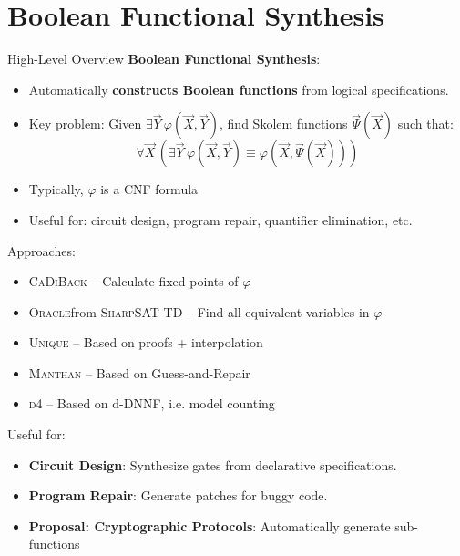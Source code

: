 \documentclass[aspectratio=169]{beamer}
\begin{document}
\section{Boolean Functional Synthesis}
\begin{frame}{High-Level Overview}
  \textbf{Boolean Functional Synthesis}:
  \begin{itemize}
    \item Automatically \textbf{constructs Boolean functions} from logical specifications.
    \item Key problem: Given \(\exists \vec{Y}\, \varphi(\vec{X}, \vec{Y})\),
        find Skolem functions \(\vec{\Psi}(\vec{X})\) such that:
        \[
            \forall \vec{X}\, \left( \exists \vec{Y}\, \varphi(\vec{X}, \vec{Y}) \equiv \varphi(\vec{X}, \vec{\Psi}(\vec{X})) \right)
        \]
    \item Typically, \(\varphi\) is a CNF formula
    \item Useful for: circuit design, program repair, quantifier elimination, etc.
\end{itemize}
\bigskip

Approaches:
\begin{itemize}
    \item \textsc{CaDiBack} -- Calculate fixed points of \(\varphi\)
    \item \textsc{Oracle}from \textsc{SharpSAT-TD} -- Find all equivalent variables in \(\varphi\)
    \item \textsc{Unique} -- Based on proofs + interpolation
    \item \textsc{Manthan} -- Based on Guess-and-Repair
    \item \textsc{d4} -- Based on d-DNNF, i.e. model counting
\end{itemize}
\bigskip

Useful for:
\begin{itemize}
    \item \textbf{Circuit Design}: Synthesize gates from declarative specifications.
    \item \textbf{Program Repair}: Generate patches for buggy code.
    \item \textbf{Proposal: Cryptographic Protocols}: Automatically generate sub-functions
\end{itemize}
\end{frame}
\end{document}
